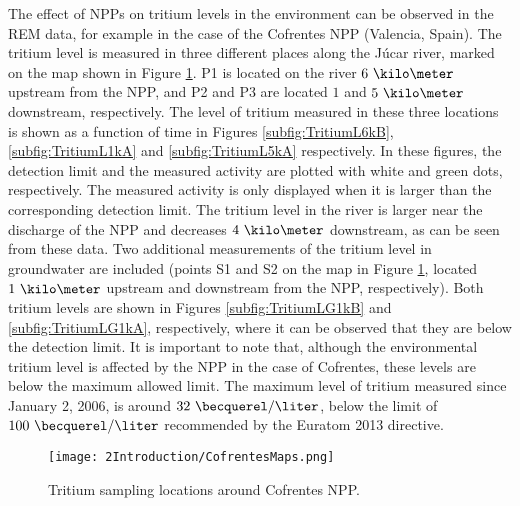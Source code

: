 The effect of NPPs on tritium levels in the environment can be observed in the REM data, for example in the case of the Cofrentes NPP (Valencia, Spain). The tritium level is measured in three different places along the Júcar river, marked on the map shown in Figure \ref{fig:SamplingLocations}. P1 is located on the river $6~\kilo\meter$ upstream from the NPP, and P2 and P3 are located $1$ and $5~\kilo\meter$ downstream, respectively. The level of tritium measured in these three locations is shown as a function of time in Figures \ref{subfig:TritiumL6kB}, \ref{subfig:TritiumL1kA} and \ref{subfig:TritiumL5kA} respectively. In these figures, the detection limit and the measured activity are plotted with white and green dots, respectively. The measured activity is only displayed when it is larger than the corresponding detection limit. The tritium level in the river is larger near the discharge of the NPP and decreases $4~\kilo\meter$ downstream, as can be seen from these data. Two additional measurements of the tritium level in groundwater are included (points S1 and S2 on the map in Figure \ref{fig:SamplingLocations}, located $1~\kilo\meter$ upstream and downstream from the NPP, respectively). Both tritium levels are shown in Figures \ref{subfig:TritiumLG1kB} and \ref{subfig:TritiumLG1kA}, respectively, where it can be observed that they are below the detection limit. It is important to note that, although the environmental tritium level is affected by the NPP in the case of Cofrentes, these levels are below the maximum allowed limit. The maximum level of tritium measured since January 2, 2006, is around $32~\becquerel/\liter$, below the limit of $100~\becquerel/\liter$ recommended by the Euratom 2013 directive.

\begin{figure}[hbtp]
\texttt{[image: 2Introduction/CofrentesMaps.png]}
\centering
\caption{Tritium sampling locations around Cofrentes NPP.\label{fig:SamplingLocations}}
\end{figure}

